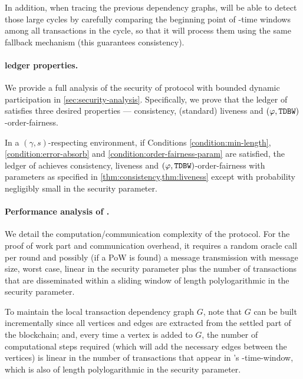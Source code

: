 In addition, when tracing the previous dependency graphs, \Taxis will be able to detect those large cycles by carefully comparing the beginning point of \PBWindowLen-time windows among all transactions in the cycle, so that it will process them using the same fallback mechanism (this guarantees consistency).



\paragraph{\Taxis ledger properties.}
%
We provide a full analysis of the security of \Taxis protocol with bounded dynamic participation in \cref{sec:security-analysis}.
%
Specifically, we prove that the ledger \ledger of \Taxis satisfies three desired properties --- consistency, (standard) liveness and $(\varphi, \mathtt{TDBW})$-order-fairness.

\begin{theorem}
    In a $(\gamma, s)$-respecting environment, if Conditions \eqref{condition:min-length}, \eqref{condition:error-absorb} and \eqref{condition:order-fairness-param} are satisfied, the ledger \ledger of \Taxis achieves consistency, liveness and $(\varphi, \mathtt{TDBW})$-order-fairness with parameters as specified in \cref{thm:consistency,thm:liveness} except with probability negligibly small in the security parameter.
\end{theorem}

\paragraph{Performance analysis of \Taxis.}
%
We detail the computation/communication complexity of the \Taxis protocol.
%
For the proof of work part and communication overhead, it requires a random oracle call per round and possibly (if a PoW is found) a message transmission with message size, worst case, linear in the security parameter plus the number of transactions that are disseminated within a sliding window of length polylogarithmic in the security parameter.

To maintain the local transaction dependency graph $G$, note that $G$ can be
built incrementally since all vertices and edges are extracted from the settled
part of the blockchain; and, every time a vertex \tx is added to $G$, the number
of computational steps required (which will add the necessary edges between the
vertices) is linear in the number of transactions that appear in \tx's
\PBWindowLen-time-window, which is also of length polylogarithmic in the
security parameter.

